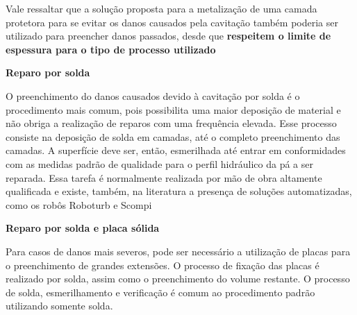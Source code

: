 Vale ressaltar que a solução proposta para a metalização de uma camada protetora
para se evitar os danos causados pela cavitação também poderia ser utilizado
para preencher danos passados, desde que \textbf{respeitem o limite de espessura
para o tipo de processo utilizado}


\textbf{Reparo por solda}

O preenchimento do danos causados devido à cavitação por solda é o procedimento
mais comum, pois possibilita uma maior deposição de material e não obriga a
realização de reparos com uma frequência elevada. Esse processo consiste na
deposição de solda em camadas, até o completo preenchimento das camadas. A
superfície deve ser, então, esmerilhada até entrar em conformidades com as
medidas padrão de qualidade para o perfil hidráulico da pá a ser reparada. Essa tarefa
é normalmente realizada por mão de obra altamente qualificada e existe, também,
na literatura a presença de soluções automatizadas, como os robôs Roboturb e Scompi
\citep{roboturb,scompi}

\textbf{Reparo por solda e placa sólida}

Para casos de danos mais severos, pode ser necessário a utilização de placas
para o preenchimento de grandes extensões. O processo de fixação das placas é
realizado por solda, assim como o preenchimento do volume restante. O processo
de solda, esmerilhamento e verificação é comum ao procedimento padrão utilizando
somente solda.















